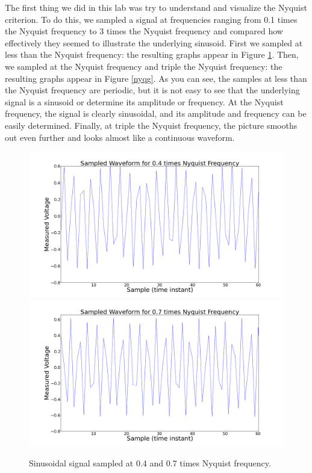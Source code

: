 \documentclass[11pt]{article}
\begin{document}
The first thing we did in this lab was try to understand and visualize
the Nyquist criterion. To do this, we sampled a signal at frequencies
ranging from 0.1 times the Nyquist frequency to 3 times the Nyquist
frequency and compared how effectively they seemed to illustrate the
underlying sinusoid. First we sampled at less than the Nyquist frequency: the resulting graphs appear in Figure \ref{nyql}. Then, we sampled at the Nyquist frequency and triple the Nyquist frequency: the resulting graphs appear in Figure \ref{nyqg}.
As you can see, the samples at less than the Nyquist frequency are
periodic, but it is not easy to see that the underlying signal is a
sinusoid or determine its amplitude or frequency. At the Nyquist frequency, the
signal is clearly sinusoidal, and its amplitude and frequency can be
easily determined. Finally, at triple the Nyquist frequency, the picture
smooths out even further and looks almost like a continuous waveform. 
\begin{figure}
\centering
\includegraphics[scale=0.35]{pictures/pointfournyq}
\includegraphics[scale=0.35]{pictures/pointsevennyq}
\caption{Sinusoidal signal sampled at 0.4 and 0.7
  times Nyquist frequency. \label{nyql}}
\end{figure}
\end{document}
